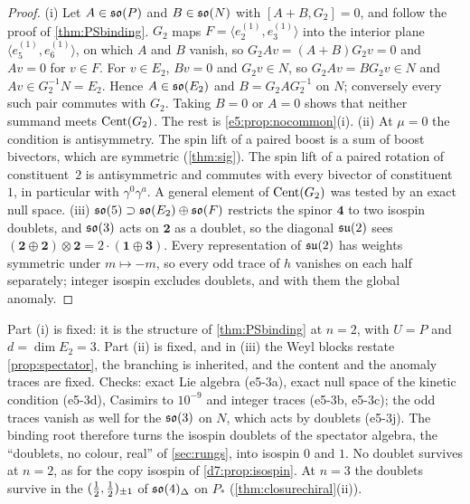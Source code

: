 \begin{proof}
(i) Let $A\in\mathfrak{so}(P)$ and $B\in\mathfrak{so}(N)$ with $[A+B,G_2]=0$, and follow the proof of \cref{thm:PSbinding}. $G_2$ maps $F=\langle e^{(1)}_2,e^{(1)}_3\rangle$
into the interior plane $\langle e^{(1)}_5,e^{(1)}_6\rangle$, on which $A$ and $B$ vanish, so $G_2Av=(A+B)G_2v=0$ and $Av=0$ for $v\in F$. For $v\in E_2$,
$Bv=0$ and $G_2v\in N$, so $G_2Av=BG_2v\in N$ and $Av\in G_2^{-1}N=E_2$. Hence $A\in\mathfrak{so}(E_2)$ and $B=G_2AG_2^{-1}$ on $N$; conversely every such pair
commutes with $G_2$. Taking $B=0$ or $A=0$ shows that neither summand meets $\operatorname{Cent}(G_2)$. The rest is \cref{e5:prop:nocommon}(i). (ii) At $\mu=0$ the
condition is antisymmetry. The spin lift of a paired boost is a sum of boost bivectors, which are symmetric (\cref{thm:sig}). The spin lift
of a paired rotation of constituent~$2$ is antisymmetric and commutes with every bivector of constituent~$1$, in particular with $\gamma^0\gamma^a$.
A general element of $\operatorname{Cent}(G_2)$ was tested by an exact null space. (iii) $\mathfrak{so}(5)\supset\mathfrak{so}(E_2)\oplus\mathfrak{so}(F)$ restricts the spinor $\mathbf4$ to two
isospin doublets, and $\mathfrak{so}(3)$ acts on $\mathbf2$ as a doublet, so the diagonal $\mathfrak{su}(2)$ sees $(\mathbf2\oplus\mathbf2)\otimes\mathbf2=2\cdot(\mathbf1\oplus\mathbf3)$.
Every representation of $\mathfrak{su}(2)$ has weights symmetric under $m\mapsto-m$, so every odd trace of $h$ vanishes on each half
separately; integer isospin excludes doublets, and with them the global anomaly.
\end{proof}

Part (i) is fixed: it is the structure of \cref{thm:PSbinding} at $n=2$, with $U=P$ and $d=\dim E_2=3$. Part (ii) is fixed, and in
(iii) the Weyl blocks restate \cref{prop:spectator}, the branching is inherited, and the content and the anomaly traces are fixed. Checks:
exact Lie algebra (e5-3a), exact null space of the kinetic condition (e5-3d), Casimirs to $10^{-9}$ and integer traces (e5-3b, e5-3c); the odd traces vanish as well for the $\mathfrak{so}(3)$ on $N$, which
acts by doublets (e5-3j). The binding
root therefore turns the isospin doublets of the spectator algebra, the ``doublets, no colour, real'' of \cref{sec:rungs}, into isospin
$0$ and $1$. No doublet survives at $n=2$, as for the copy isospin of \cref{d7:prop:isospin}. At $n=3$ the doublets survive in the
$(\tfrac12,\tfrac12)_{\pm1}$ of $\mathfrak{so}(4)_\Delta$ on $P_*$ (\cref{thm:closurechiral}(ii)).

